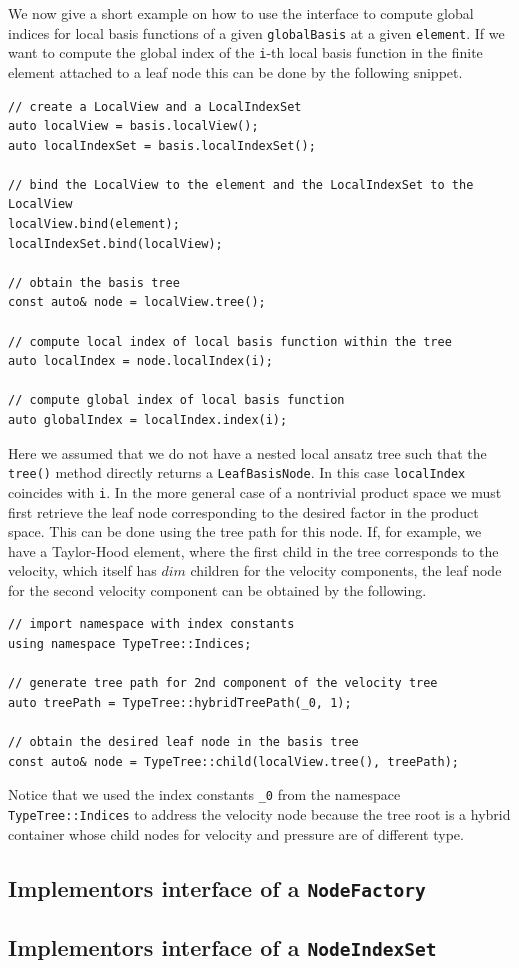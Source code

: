 \documentclass[a4paper,10pt,headings=normal,bibliography=totoc]{scrartcl}
\begin{document}
We now give a short example on how to use the interface
to compute global indices for local basis functions
of a given \texttt{globalBasis} at a given \texttt{element}.
If we want to compute the global index of the \texttt{i}-th
local basis function in the finite element attached to
a leaf node this can be done by the following snippet.

\begin{lstlisting}
// create a LocalView and a LocalIndexSet
auto localView = basis.localView();
auto localIndexSet = basis.localIndexSet();

// bind the LocalView to the element and the LocalIndexSet to the LocalView
localView.bind(element);
localIndexSet.bind(localView);

// obtain the basis tree
const auto& node = localView.tree();

// compute local index of local basis function within the tree
auto localIndex = node.localIndex(i);

// compute global index of local basis function
auto globalIndex = localIndex.index(i);
\end{lstlisting}

Here we assumed that we do not have a nested local ansatz tree
such that the \texttt{tree()} method directly returns a \texttt{LeafBasisNode}.
In this case \texttt{localIndex} coincides with \texttt{i}.
In the more general case of a nontrivial product space
we must first retrieve the leaf node corresponding to
the desired factor in the product space. This can be done
using the tree path for this node. If, for example,
we have a Taylor-Hood element, where the first
child in the tree corresponds to the velocity,
which itself has $dim$ children for the velocity
components, the leaf node for the second velocity
component can be obtained by the following.

\begin{lstlisting}
// import namespace with index constants
using namespace TypeTree::Indices;

// generate tree path for 2nd component of the velocity tree
auto treePath = TypeTree::hybridTreePath(_0, 1);

// obtain the desired leaf node in the basis tree
const auto& node = TypeTree::child(localView.tree(), treePath);
\end{lstlisting}

Notice that we used the index constants \texttt{\_0}
from the namespace \texttt{TypeTree::Indices}
to address the velocity node because the
tree root is a hybrid container whose child nodes
for velocity and pressure are of different type.

\subsection{Implementors interface of a \texttt{NodeFactory}}
\subsection{Implementors interface of a \texttt{NodeIndexSet}}






\end{document}

